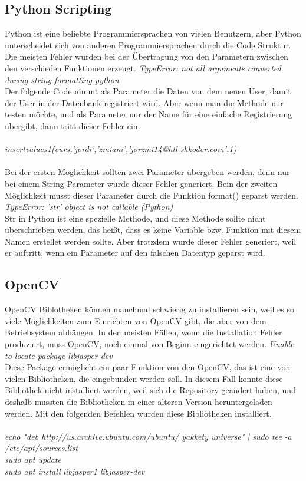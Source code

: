 \subsection{Python Scripting}
Python ist eine beliebte Programmiersprachen von vielen Benutzern, aber Python unterscheidet sich von anderen Programmiersprachen durch die Code Struktur. Die meisten Fehler wurden bei der Übertragung von den Parametern zwischen den verschieden Funktionen erzeugt.
\bigbreak
\textit{TypeError: not all arguments converted during string formatting python}\\
Der folgende Code nimmt als Parameter die Daten von dem neuen User, damit der User in der Datenbank registriert wird. Aber wenn man die Methode nur testen möchte, und als Parameter nur der Name für eine einfache Registrierung übergibt, dann tritt dieser Fehler ein. \\\\
\textit{insertvalues1(curs,'jordi','zmiani','jorzmi14@htl-shkoder.com',1)}\\\\
Bei der ersten Möglichkeit sollten zwei Parameter übergeben werden, denn nur bei einem String Parameter wurde dieser Fehler generiert.
Bein der zweiten Möglichkeit musst dieser Parameter durch die Funktion format()  geparst werden.
\bigbreak
\textit{TypeError: 'str' object is not callable (Python)}\\
Str in Python ist eine spezielle Methode, und diese Methode sollte nicht überschrieben werden, das heißt, dass es keine Variable bzw. Funktion mit diesem Namen erstellet werden  sollte. Aber trotzdem wurde dieser Fehler generiert, weil er auftritt, wenn ein Parameter auf den falschen Datentyp geparst wird.

\subsection{OpenCV}
OpenCV Biblotheken können manchmal schwierig zu installieren sein, weil es so viele Möglichkeiten zum Einrichten von OpenCV gibt, die aber von dem Betriebsystem abhängen. In den meisten Fällen, wenn die Installation Fehler produziert, muss OpenCV, noch einmal von Beginn eingerichtet werden.
\bigbreak
\textit{Unable to locate package libjasper-dev}\\
Diese Package ermöglicht ein paar Funktion von den OpenCV, das ist eine von vielen Bibliotheken, die eingebunden werden soll. In diesem Fall konnte diese Bibliothek nicht installiert werden, weil sich die Repository geändert haben, und deshalb mussten die Bibliotheken in einer älteren Version heruntergeladen werden. Mit den folgenden Befehlen wurden diese Bibliotheken installiert.\\\\
\textit{echo "deb http://us.archive.ubuntu.com/ubuntu/ yakkety universe" | sudo tee -a \\ /etc/apt/sources.list}\\
\textit{sudo apt update}\\
\textit{sudo apt install libjasper1 libjasper-dev}

